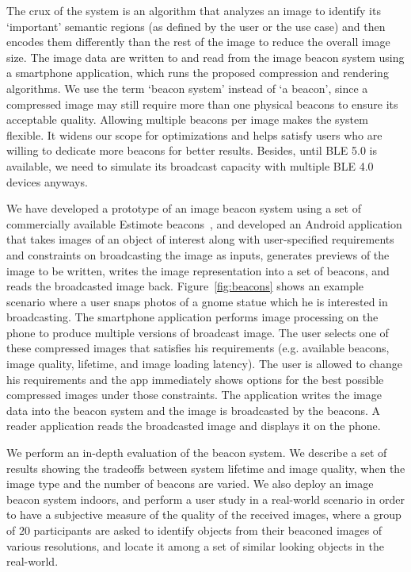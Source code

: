The crux of the system is an algorithm that analyzes an image to identify its `important' semantic regions (as defined by the user or the use case) and then encodes them differently than the rest of the image to reduce the overall image size. The image data are written to and read from the image beacon system using a smartphone application, which runs the proposed compression and rendering algorithms. We use the term `beacon system' instead of `a beacon', since a compressed image may still require more than one physical beacons to ensure its acceptable quality. Allowing multiple beacons per image makes the system flexible. It widens our scope for optimizations and helps satisfy users who are willing to dedicate more beacons for better results. Besides, until BLE 5.0 is available, we need to simulate its broadcast capacity with multiple BLE 4.0 devices anyways.


We have developed a prototype of an image beacon system using a set of commercially available Estimote beacons~\cite{ESTIMOTE}, and developed an Android application that takes images of an object of interest along with user-specified requirements and constraints on broadcasting the image as inputs, generates previews of the image to be written, writes the image representation into a set of beacons, and reads the broadcasted image back. Figure~\ref{fig:beacons} shows an example scenario where a user snaps photos of a gnome statue which he is interested in broadcasting. The smartphone application performs image processing on the phone to produce multiple versions of broadcast image. The user selects one of these compressed images that satisfies his requirements (e.g. available beacons, image quality, lifetime, and image loading latency). The user is allowed to change his requirements and the app immediately shows options for the best possible compressed images under those constraints. The application writes the image data into the beacon system and the image is broadcasted by the beacons. A reader application reads the broadcasted image and displays it on the phone.


We perform an in-depth evaluation of the beacon system. We describe a set of results showing the tradeoffs between system lifetime and image quality, when the image type and the number of beacons are varied. We also deploy an image beacon system indoors, and perform a user study in a real-world scenario in order to have a subjective measure of the quality of the received images, where a group of $20$ participants are asked to identify objects from their beaconed images of various resolutions, and locate it among a set of similar looking objects in the real-world.

